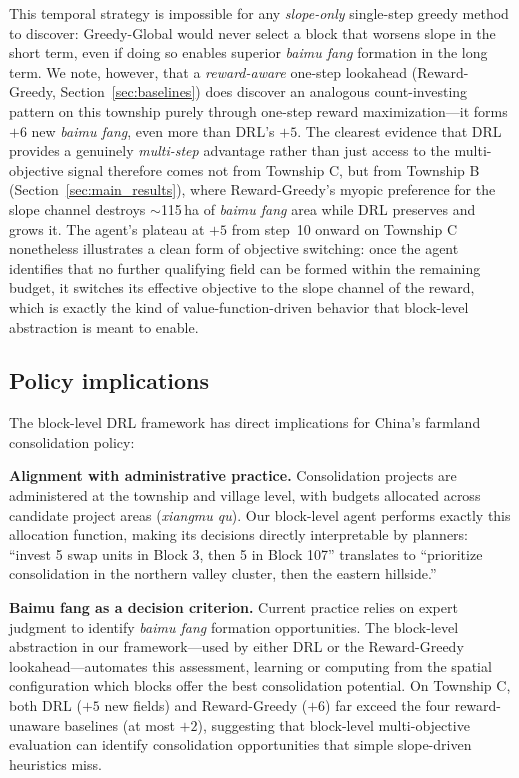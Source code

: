 \documentclass[preprint,12pt]{elsarticle}
\begin{document}
This temporal strategy is impossible for any \emph{slope-only} single-step greedy method to discover: Greedy-Global would never select a block that worsens slope in the short term, even if doing so enables superior \textit{baimu fang} formation in the long term. We note, however, that a \emph{reward-aware} one-step lookahead (Reward-Greedy, Section~\ref{sec:baselines}) does discover an analogous count-investing pattern on this township purely through one-step reward maximization---it forms $+6$ new \textit{baimu fang}, even more than DRL's $+5$. The clearest evidence that DRL provides a genuinely \emph{multi-step} advantage rather than just access to the multi-objective signal therefore comes not from Township C, but from Township B (Section~\ref{sec:main_results}), where Reward-Greedy's myopic preference for the slope channel destroys $\sim$115\,ha of \textit{baimu fang} area while DRL preserves and grows it. The agent's plateau at $+5$ from step~10 onward on Township C nonetheless illustrates a clean form of objective switching: once the agent identifies that no further qualifying field can be formed within the remaining budget, it switches its effective objective to the slope channel of the reward, which is exactly the kind of value-function-driven behavior that block-level abstraction is meant to enable.

\subsection{Policy implications}

The block-level DRL framework has direct implications for China's farmland consolidation policy:

\textbf{Alignment with administrative practice.} Consolidation projects are administered at the township and village level, with budgets allocated across candidate project areas (\textit{xiangmu qu}). Our block-level agent performs exactly this allocation function, making its decisions directly interpretable by planners: ``invest 5 swap units in Block 3, then 5 in Block 107'' translates to ``prioritize consolidation in the northern valley cluster, then the eastern hillside.''

\textbf{Baimu fang as a decision criterion.} Current practice relies on expert judgment to identify \textit{baimu fang} formation opportunities. The block-level abstraction in our framework---used by either DRL or the Reward-Greedy lookahead---automates this assessment, learning or computing from the spatial configuration which blocks offer the best consolidation potential. On Township C, both DRL ($+5$ new fields) and Reward-Greedy ($+6$) far exceed the four reward-unaware baselines (at most $+2$), suggesting that block-level multi-objective evaluation can identify consolidation opportunities that simple slope-driven heuristics miss.
\end{document}

